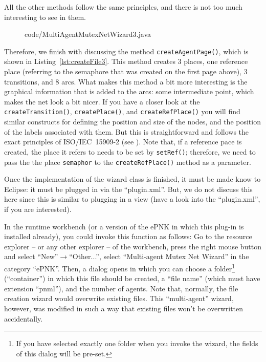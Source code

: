 All the other methods follow the same principles, and there  is
not too much interesting to see in them.
%
\begin{figure}[htbp!]
%
  {code/MultiAgentMutexNetWizard3.java}
\end{figure}
% 
Therefore, we finish with discussing the method {\tt  createAgentPage()},
which is shown in Listing~\ref{lst:createFile3}. This method
creates 3 places, one reference place (referring to the semaphore
that was created on the first page above), 3 transitions, and 8 arcs.
What makes this method a bit more interesting is the graphical
information that is added to the arcs: some intermediate point,
which makes the net look a bit nicer. If you have a closer look
at the {\tt createTransition()}, {\tt createPlace()}, and  {\tt createRefPlace()}
you will find similar constructs for defining the position and size
of the nodes, and the position of the labels associated with them.
But this is straightforward and follows the exact principles
of ISO/IEC~15909-2 (see \cite{HKea09}). Note that, if a reference
pace is created, the place it refers to needs to be set by
{\tt setRef()}; therefore, we need to pass the the place {\tt semaphor}
to the {\tt createRefPlace()} method as a parameter.

Once the implementation
of the wizard class is finished, it must be made know to Eclipse: it must be
plugged in via the ``plugin.xml''. But, we do not discuss this here since
this is similar to plugging in a view (have a look
into the ``plugin.xml'', if you are interested).

In the runtime workbench (or a version of the ePNK in which this plug-in
is installed already), you could invoke this function as follows: Go to the
resource explorer -- or any other explorer -- of the workbench, press
the right mouse button and select ``New''$\rightarrow$``Other...'',
select ``Multi-agent Mutex Net Wizard'' in the category ``ePNK''. Then,
a dialog opens in which you can choose a folder\footnote
  {If you have selected exactly one folder when you invoke the
   wizard, the fields of this dialog will be pre-set.}
(``container'') in which this file should be created, a ``file name'' (which
must have extension ``pnml''), and the number of agents. Note that, normally,
the file creation wizard would overwrite existing files. This ``multi-agent''
wizard, however, was modified in such a way that existing files won't be
overwritten accidentally.%

